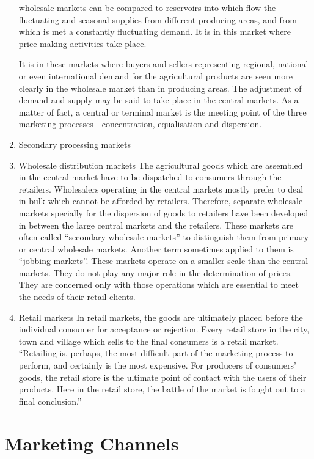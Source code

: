 \documentclass[11pt,]{book}
\theoremstyle{definition}
\theoremstyle{definition}
\theoremstyle{definition}
\theoremstyle{remark}
\begin{document}
\begin{enumerate}
  wholesale markets can be compared to reservoirs into which flow the
  fluctuating and seasonal supplies from different producing areas, and
  from which is met a constantly fluctuating demand. It is in this
  market where price-making activities take place. \par
  It is in these markets where buyers and sellers representing regional,
  national or even international demand for the agricultural products
  are seen more clearly in the wholesale market than in producing areas.
  The adjustment of demand and supply may be said to take place in the
  central markets. As a matter of fact, a central or terminal market is
  the meeting point of the three marketing processes - concentration,
  equalisation and dispersion.
\item
  Secondary processing markets
\item
  Wholesale distribution markets \newline The agricultural goods which
  are assembled in the central market have to be dispatched to consumers
  through the retailers. Wholesalers operating in the central markets
  mostly prefer to deal in bulk which cannot be afforded by retailers.
  Therefore, separate wholesale markets specially for the dispersion of
  goods to retailers have been developed in between the large central
  markets and the retailers. These markets are often called ``secondary
  wholesale markets'' to distinguish them from primary or central
  wholesale markets. Another term sometimes applied to them is ``jobbing
  markets''. These markets operate on a smaller scale than the central
  markets. They do not play any major role in the determination of
  prices. They are concerned only with those operations which are
  essential to meet the needs of their retail clients.
\item
  Retail markets \newline In retail markets, the goods are ultimately
  placed before the individual consumer for acceptance or rejection.
  Every retail store in the city, town and village which sells to the
  final consumers is a retail market. ``Retailing is, perhaps, the most
  difficult part of the marketing process to perform, and certainly is
  the most expensive. For producers of consumers' goods, the retail
  store is the ultimate point of contact with the users of their
  products. Here in the retail store, the battle of the market is fought
  out to a final conclusion.''
\end{enumerate}

\section{Marketing Channels}\label{marketing-channels}
\end{document}
